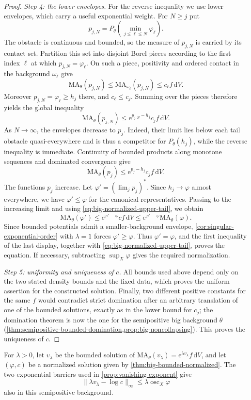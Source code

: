 \begin{proof}
\emph{Step 4: the lower envelopes.} For the reverse inequality we use lower envelopes, which carry a useful exponential weight. For $N\geq j$ put
\[
 p_{j,N}=P_\theta\left(\min_{j\leq\ell\leq N}\varphi_\ell\right).
\]
The obstacle is continuous and bounded, so the measure of $p_{j,N}$ is carried by its contact set. Partition this set into disjoint Borel pieces according to the first index $\ell$ at which $p_{j,N}=\varphi_\ell$. On such a piece, positivity and ordered contact in the background $\omega_\ell$ give
\[
 \mathrm{MA}_\theta(p_{j,N})
 \leq\mathrm{MA}_{\omega_\ell}(p_{j,N})
 \leq c_\ell f\,\mathrm{d}V.
\]
Moreover $p_{j,N}=\varphi_\ell\geq h_j$ there, and $c_\ell\leq c_j$. Summing over the pieces therefore yields the global inequality
\[
 \mathrm{MA}_\theta(p_{j,N})
 \leq \mathrm{e}^{p_{j,N}-h_j}c_jf\,\mathrm{d}V.
\]
As $N\to\infty$, the envelopes decrease to $p_j$. Indeed, their limit lies below each tail obstacle quasi-everywhere and is thus a competitor for $P_\theta(h_j)$, while the reverse inequality is immediate. Continuity of bounded products along monotone sequences and dominated convergence give
\[
 \mathrm{MA}_\theta(p_j)\leq \mathrm{e}^{p_j-h_j}c_jf\,\mathrm{d}V.
\]
The functions $p_j$ increase. Let $\varphi'=(\lim_jp_j)^*$. Since $h_j\to\varphi$ almost everywhere, we have $\varphi'\leq\varphi$ for the canonical representatives. Passing to the increasing limit and using \eqref{eq:big-normalized-upper-tail}, we obtain
\[
 \mathrm{MA}_\theta(\varphi')
 \leq \mathrm{e}^{\varphi'-\varphi}cf\,\mathrm{d}V
 \leq \mathrm{e}^{\varphi'-\varphi}\mathrm{MA}_\theta(\varphi).
\]
Since bounded potentials admit a smaller-background envelope, \cref{cor:singular-exponential-order} with $\lambda=1$ forces $\varphi'\geq\varphi$. Thus $\varphi'=\varphi$, and the first inequality of the last display, together with \eqref{eq:big-normalized-upper-tail}, proves the equation. If necessary, subtracting $\sup_X\varphi$ gives the required normalization.

\emph{Step 5: uniformity and uniqueness of $c$.} All bounds used above depend only on the two stated density bounds and the fixed data, which proves the uniform assertion for the constructed solution. Finally, two different positive constants for the same $f$ would contradict strict domination after an arbitrary translation of one of the bounded solutions, exactly as in the lower bound for $c_j$; the domination theorem is now the one for the semipositive big background $\theta$ (\cref{thm:semipositive-bounded-domination,prop:big-noncollapsing}). This proves the uniqueness of $c$.
\end{proof}

For $\lambda>0$, let $v_\lambda$ be the bounded solution of $\mathrm{MA}_\theta(v_\lambda)=\mathrm{e}^{\lambda v_\lambda}f\,\mathrm{d}V$, and let $(\varphi,c)$ be a normalized solution given by \cref{thm:big-bounded-normalized}. The two exponential barriers used in \cref{prop:vanishing-exponent} give
\[
 \|\lambda v_\lambda-\log c\|_\infty
 \leq\lambda\operatorname{osc}_X\varphi
\]
also in this semipositive background.
